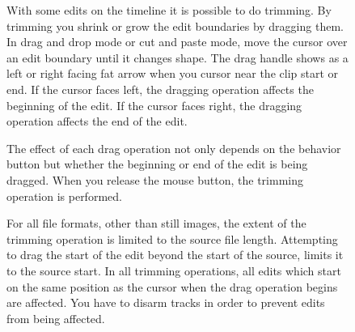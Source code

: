 \begin{figure}
With some edits on the timeline it is possible to do trimming. By trimming you shrink or grow the edit boundaries by dragging them. In drag and drop mode or cut and paste mode, move the cursor over an edit boundary until it changes shape. The drag handle shows as a left or right facing fat arrow when you cursor near the clip start or end.  If the cursor faces left, the dragging operation affects the beginning of the edit. If the cursor faces right, the dragging operation affects the end of the edit.

The effect of each drag operation not only depends on the behavior button but whether the beginning or end of the edit is being dragged. When you release the mouse button, the trimming operation is performed.

For all file formats, other than still images, the extent of the trimming operation is limited to the source file length. Attempting to drag the start of the edit beyond the start of the source, limits it to the source start. In all trimming operations, all edits which start on the same position as the cursor when the drag operation begins are affected. You have to disarm tracks in order to prevent edits from being affected.


\end{figure}
